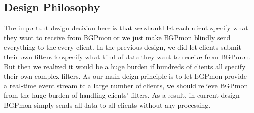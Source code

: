 \subsection{Design Philosophy}
The important design decision here is that we should let each client specify what they want to receive from BGPmon or we just make BGPmon blindly send everything to the every client.
In the previous design, we did let clients submit their own filters to specify what kind of data they want to receive from BGPmon. But then we realized it would be a huge burden if hundreds of clients all specify their own complex filters.
As our main deign principle is to let BGPmon provide a real-time event stream to a large number of clients, we should relieve BGPmon from the huge burden of handling clients' filters.  As a result, in current design BGPmon simply sends all data to all clients without any processing.  
